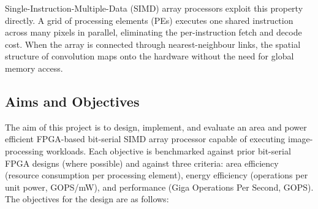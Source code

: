        Single-Instruction-Multiple-Data (SIMD) array processors exploit this property directly. A grid of processing elements (PEs) executes one shared instruction across many pixels in parallel, eliminating the per-instruction fetch and decode cost. When the array is connected through nearest-neighbour links, the spatial structure of convolution maps onto the hardware without the need for global memory access. 
        

        \subsection{Aims and Objectives}\label{sec:aims}
        The aim of this project is to design, implement, and evaluate an area and power efficient FPGA-based bit-serial SIMD array processor capable of executing image-processing workloads. Each objective is benchmarked against prior bit-serial FPGA designs (where possible) and against three criteria: area efficiency (resource consumption per processing element), energy efficiency (operations per unit power, GOPS/mW), and performance (Giga Operations Per Second, GOPS). The objectives for the design are as follows:
        
